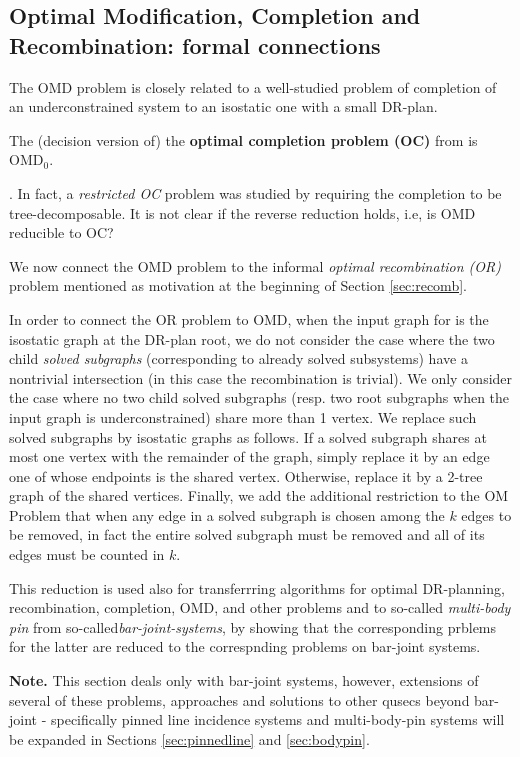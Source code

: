 \subsection{Optimal Modification, Completion and Recombination: formal
connections}
%
The OMD problem is closely related to a well-studied problem of
completion of an underconstrained system to an isostatic one with a small
DR-plan.
\begin{observation}
The (decision version of) the {\bf optimal completion problem (OC)} from \cite{bib:survey, j-a,
fang} is OMD$_0$.
\end{observation}.
In fact, a {\em restricted OC} problem was studied by \cite{j-a} requiring the
completion to be tree-decomposable.
It is not clear if the reverse reduction holds, i.e, is OMD reducible to OC?

We now connect the OMD problem to the informal {\em optimal recombination
(OR)} problem
mentioned as motivation at the beginning of
Section \ref{sec:recomb}.

In order to connect the OR problem to OMD,
when the input graph for is the isostatic graph at the DR-plan root, we do not consider the case
where the two child {\em solved subgraphs}
(corresponding to already solved subsystems)
have a nontrivial intersection (in this case
the recombination is trivial). We only consider the case where no two child
solved subgraphs (resp. two root subgraphs when the input graph is
underconstrained) share more than 1 vertex.
We replace such solved subgraphs  by isostatic graphs as
follows. If a solved subgraph shares at most one vertex with the remainder of
the graph, simply replace it by an edge one of whose endpoints  is
the shared vertex. Otherwise, replace it by  a 2-tree graph of the shared vertices.
Finally, we add the additional
restriction to the OM Problem that
when any edge in a solved subgraph is chosen among the $k$ edges to be
removed, in fact the entire solved subgraph must be removed  and all of its
edges must be counted in $k$.

This reduction is used also for transferrring  algorithms for
optimal DR-planning, recombination, completion, OMD, and other problems and
to so-called {\em
multi-body pin} from so-called{\em bar-joint-systems}, by showing that the corresponding
prblems for the latter are reduced to the correspnding problems on
bar-joint systems.

{\bf Note.} This section deals only with bar-joint systems, however,
extensions of several of these problems, approaches and solutions
to other qusecs beyond  bar-joint - specifically pinned line incidence
systems and
multi-body-pin systems
will be expanded in Sections \ref{sec:pinnedline} and \ref{sec:bodypin}.
